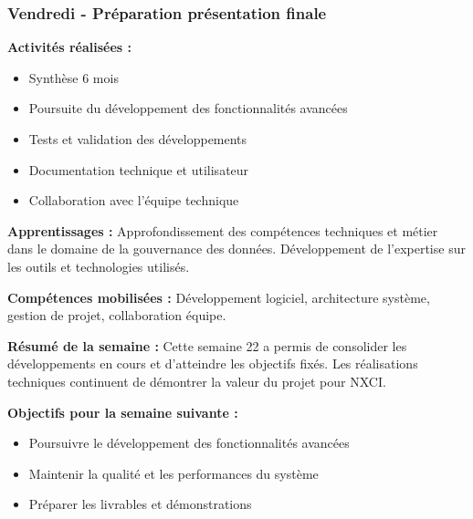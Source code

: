 \subsubsection{Vendredi - Préparation présentation finale}

\textbf{Activités réalisées :}
\begin{itemize}
    \item Synthèse 6 mois
    \item Poursuite du développement des fonctionnalités avancées
    \item Tests et validation des développements
    \item Documentation technique et utilisateur
    \item Collaboration avec l'équipe technique
\end{itemize}

\textbf{Apprentissages :}
Approfondissement des compétences techniques et métier dans le domaine de la gouvernance des données. Développement de l'expertise sur les outils et technologies utilisés.

\textbf{Compétences mobilisées :}
Développement logiciel, architecture système, gestion de projet, collaboration équipe.

\textbf{Résumé de la semaine :}
Cette semaine 22 a permis de consolider les développements en cours et d'atteindre les objectifs fixés. Les réalisations techniques continuent de démontrer la valeur du projet pour NXCI.

\textbf{Objectifs pour la semaine suivante :}
\begin{itemize}
    \item Poursuivre le développement des fonctionnalités avancées
    \item Maintenir la qualité et les performances du système
    \item Préparer les livrables et démonstrations
\end{itemize}

